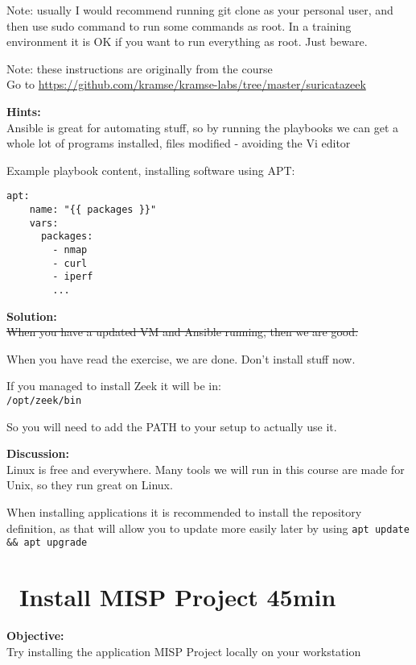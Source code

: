 \documentclass[a4paper,11pt,notitlepage]{report}
\begin{document}
Note: usually I would recommend running git clone as your personal user, and then use sudo command to run some commands as root. In a training environment it is OK if you want to run everything as root. Just beware.

Note: these instructions are originally from the course\\
Go to \url{https://github.com/kramse/kramse-labs/tree/master/suricatazeek}

{\bf Hints:}\\
Ansible is great for automating stuff, so by running the playbooks we can get a whole lot of programs installed, files modified - avoiding the Vi editor \smiley

Example playbook content, installing software using APT:
\begin{verbatim}
apt:
    name: "{{ packages }}"
    vars:
      packages:
        - nmap
        - curl
        - iperf
        ...
\end{verbatim}

{\bf Solution:}\\
\sout{When you have a updated VM and Ansible running, then we are good.}

When you have read the exercise, we are done. Don't install stuff now.

If you managed to install Zeek it will be in:\\
\verb+/opt/zeek/bin+

So you will need to add the PATH to your setup to actually use it.

{\bf Discussion:}\\
Linux is free and everywhere. Many tools we will run in this course are made for Unix, so they run great on Linux.

When installing applications it is recommended to install the repository definition, as that will allow you to update more easily later by using \verb+apt update && apt upgrade+




\chapter{\faInfoCircle\ Install MISP Project 45min}
\label{ex:misp-install}


{\bf Objective:}\\
Try installing the application MISP Project locally on your workstation
\end{document}
